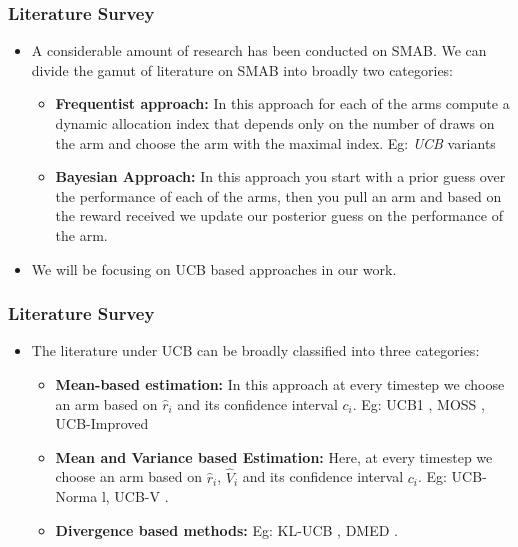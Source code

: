 \begin{frame}
\frametitle{Literature Survey}
\begin{itemize}
\item<1-> A considerable amount of research has been conducted on SMAB. We can divide the gamut of literature on SMAB into broadly two categories:
\begin{itemize}
\item<2-> \textbf{Frequentist approach:} In this approach for each of the arms compute a dynamic allocation index that depends only on the number of draws on the arm and choose the arm with the maximal index. Eg:  \emph{UCB} variants
\item<3-> \textbf{Bayesian Approach:} In this approach you start with a prior guess over the performance of each of the arms, then you pull an arm and based on the reward received we update our posterior guess on the performance of the arm. 
\end{itemize} 
\item<4-> We will be focusing on UCB based approaches in our work.
\end{itemize}
\end{frame}

\begin{frame}
\frametitle{Literature Survey}
\begin{itemize}
\item<1-> The literature under UCB can be broadly classified into three categories:
\begin{itemize}
\item<2-> \textbf{Mean-based estimation: } In this approach at every timestep we choose an arm based on $\hat{r}_i$ and its confidence interval $c_i$. Eg: UCB1 \cite{auer2002finite}, MOSS \cite{audibert2009minimax}, UCB-Improved \cite{auer2010ucb}
\item<3-> \textbf{Mean and Variance based Estimation: } Here, at every timestep we choose an arm based on $\hat{r}_i$, $\hat{V}_i$ and its confidence interval $c_i$. Eg: UCB-Norma \cite{auer2002finite}l, UCB-V \cite{audibert2009exploration}.
\item<4-> \textbf{Divergence based methods: } Eg: KL-UCB \cite{garivier2011kl}, DMED \cite{honda2010asymptotically}.
\end{itemize}
\end{itemize} 
\end{frame}

